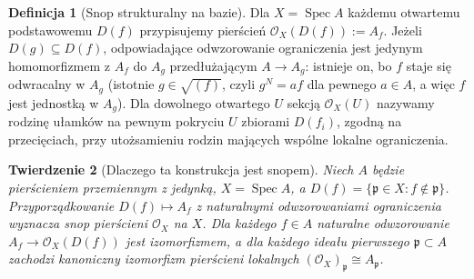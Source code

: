 \documentclass[11pt,a4paper,openany]{report}
\numberwithin{equation}{section}
\theoremstyle{plain}
\newtheorem{twierdzenie}{Twierdzenie}[section]
\theoremstyle{definition}
\newtheorem{definicja}[twierdzenie]{Definicja}
\theoremstyle{remark}
\newcommand{\Spec}{\operatorname{Spec}}
\begin{document}
\begin{definicja}[Snop strukturalny na bazie]
\label{def:O-Spec}
Dla $X=\Spec A$ każdemu otwartemu podstawowemu
$D(f)$ przypisujemy pierścień
$\mathcal O_X(D(f)):=A_f$.
Jeżeli $D(g)\subseteq D(f)$, odpowiadające
odwzorowanie ograniczenia jest jedynym homomorfizmem
z $A_f$ do $A_g$ przedłużającym $A\to A_g$:
istnieje on, bo $f$ staje się odwracalny w $A_g$
(istotnie $g\in\sqrt{(f)}$, czyli $g^N=af$
dla pewnego $a\in A$, a więc $f$ jest jednostką
w $A_g$). Dla dowolnego otwartego $U$ sekcją
$\mathcal O_X(U)$ nazywamy rodzinę ułamków
na pewnym pokryciu $U$ zbiorami $D(f_i)$,
zgodną na przecięciach, przy utożsamieniu
rodzin mających wspólne lokalne ograniczenia.
\end{definicja}

\begin{twierdzenie}[Dlaczego ta konstrukcja jest snopem]
\label{tw:structural-sheaf}
Niech $A$ będzie pierścieniem przemiennym z jedynką,
$X=\Spec A$, a $D(f)=\{\mathfrak p\in X:f\notin\mathfrak p\}$.
Przyporządkowanie $D(f)\mapsto A_f$ z naturalnymi
odwzorowaniami ograniczenia wyznacza snop pierścieni
$\mathcal O_X$ na $X$.
Dla każdego $f\in A$ naturalne odwzorowanie
$A_f\to\mathcal O_X(D(f))$ jest izomorfizmem,
a dla każdego ideału pierwszego $\mathfrak p\subset A$
zachodzi kanoniczny izomorfizm pierścieni lokalnych
$(\mathcal O_X)_{\mathfrak p}\cong A_{\mathfrak p}$.
\end{twierdzenie}
\end{document}
